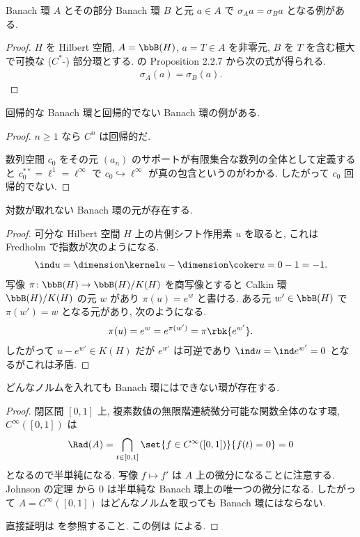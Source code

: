 \documentclass[openany, a4paper, oneside]{jsbook}
\begin{document}
\begin{ex}
Banach 環 $A$ とその部分 Banach 環 $B$ と元 $a \in A$ で $\sigma_A a = \sigma_B a$ となる例がある.
\end{ex}
\begin{proof}
$H$ を Hilbert 空間, $A = \bbB (H)$, $a = T \in A$ を非零元,
$B$ を $T$ を含む極大で可換な ($C^*$-) 部分環とする.
\cite{BratteliRobinson1} の Proposition 2.2.7 から次の式が得られる.
\begin{align}
 \sigma_A (a)
 =
 \sigma_B (a).
\end{align}
\end{proof}

\begin{ex}
回帰的な Banach 環と回帰的でない Banach 環の例がある.
\end{ex}
\begin{proof}
$n \geq 1$ なら $C^n$ は回帰的だ.

数列空間 $c_0$ をその元 $(a_n)$ のサポートが有限集合な数列の全体として定義すると
$c_0^{**} = \ell^1 = \ell^{\infty}$ で $c_0 \hookrightarrow \ell^{\infty}$ が真の包含というのがわかる.
したがって $c_0$ 回帰的でない.
\end{proof}

\begin{ex}
対数が取れない Banach 環の元が存在する.
\end{ex}
\begin{proof}
可分な Hilbert 空間 $H$ 上の片側シフト作用素 $u$ を取ると, これは Fredholm で指数が次のようになる.
\begin{align}
\ind u = \dimension \kernel u - \dimension \coker u = 0 - 1 = -1.
\end{align}
写像 $\pi \colon \bbB(H) \to \bbB (H) / K(H)$ を商写像とすると
Calkin 環 $\bbB(H) / K(H)$ の元 $w$ があり $\pi(u) = e^{w}$ と書ける.
ある元 $w' \in \bbB(H)$ で $\pi (w') = w$ となる元があり, 次のようになる.
\begin{align}
 \pi(u)
 =
 e^{w}
 =
 e^{\pi (w')}
 =
 \pi \rbk{e^{w'}}.
\end{align}
したがって $u - e^{w'} \in K(H)$ だが $e^{w'}$ は可逆であり $\ind u = \ind e^{w'} = 0$ となるがこれは矛盾.
\end{proof}

\begin{ex}
どんなノルムを入れても Banach 環にはできない環が存在する.
\end{ex}
\begin{proof}
閉区間 $[0, 1]$ 上, 複素数値の無限階連続微分可能な関数全体のなす環,
$C^{\infty}([0, 1])$ は
\begin{align}
 \Rad (A)
 =
 \bigcap_{t \in [0, 1]} \set{f \in C^{\infty}([0, 1])}{f(t) = 0}
 = 0
\end{align}
となるので半単純になる.
写像 $f \mapsto f'$ は $A$ 上の微分になることに注意する.
Johnson の定理 \cite[Theorem 18.21]{BonsallDuncan1} から
$0$ は半単純な Banach 環上の唯一つの微分になる.
したがって $A = C^{\infty}([0, 1])$ はどんなノルムを取っても Banach 環にはならない.

直接証明は \cite[Corollary 4.1.12]{BernardAupetit1} を参照すること.
この例は \cite{GESilov1} による.
\end{proof}
\end{document}
